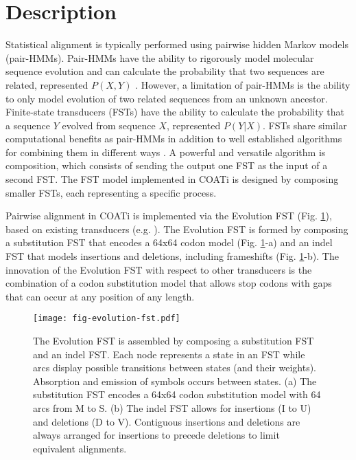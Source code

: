 \section{Description}

Statistical alignment is typically performed using pairwise hidden Markov
models (pair-HMMs).
Pair-HMMs have the ability to rigorously model molecular sequence evolution and
can calculate the probability that two sequences are related, represented
$P(X, Y)$ \parencite{yoon_2009_hmm}.
However, a limitation of pair-HMMs is the ability to only model evolution of two
related sequences from an unknown ancestor.
Finite-state transducers (FSTs) have the ability to calculate the probability
that a sequence $Y$ evolved from sequence $X$, represented $P(Y | X)$.
FSTs share similar computational benefits as pair-HMMs in addition to well
established algorithms for combining them in different ways
\parencite{bradley2007transducers}.
A powerful and versatile algorithm is composition, which consists of sending the
output one FST as the input of a second FST.
The FST model implemented in COATi is designed by composing smaller FSTs, each
representing a specific process.

Pairwise alignment in COATi is implemented via the Evolution FST (Fig.
\ref{fig:evolution-fst}), based on existing transducers (e.g.
\cite{holmes2001evolutionary}).
The Evolution FST is formed by composing a substitution FST that encodes a 64x64
codon model (Fig. \ref{fig:evolution-fst}-a) and an indel FST that models
insertions and deletions, including frameshifts (Fig. \ref{fig:evolution-fst}-b).
The innovation of the Evolution FST with respect to other transducers is the
combination of a codon substitution model that allows stop codons with gaps that
can occur at any position of any length.

\begin{figure}[h!]
\begin{framed}
\centering
    \texttt{[image: fig-evolution-fst.pdf]}
    \caption{The Evolution FST is assembled by composing a substitution FST and
    an indel FST. Each node represents a state in an FST while arcs display
    possible transitions between states (and their weights). Absorption and
    emission of symbols occurs between states. (a) The substitution FST
    encodes a 64x64 codon substitution model with 64 arcs from M to S. (b)
    The indel FST allows for insertions (I to U) and deletions (D to V).
    Contiguous insertions and deletions are always arranged for insertions to
    precede deletions to limit equivalent alignments.}
    \label{fig:evolution-fst}
\end{framed}
\end{figure}


